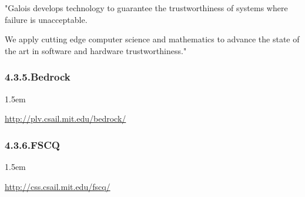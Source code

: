 \documentclass[12pt,twoside]{article}
\begin{document}
\noindent{}"Galois develops technology to guarantee the trustworthiness of
 systems where failure is unacceptable.%

 We apply cutting edge computer science and mathematics to advance the
 state of the art in software and hardware trustworthiness."%

\subsubsection{4.3.5.\hspace*{0.5em}Bedrock}\label{sec-bedrock}%

\begin{mddefinitions}%


\begin{mdbmarginx}{}{}{}{1.5em}%
\begin{mddefdata}%
\href{http://plv.csail.mit.edu/bedrock/}{{\ttfamily http://\hspace{0pt}plv.\hspace{0pt}csail.\hspace{0pt}mit.\hspace{0pt}edu/\hspace{0pt}bedrock/\hspace{0pt}}}%
\end{mddefdata}%
\end{mdbmarginx}%
\end{mddefinitions}%

\subsubsection{4.3.6.\hspace*{0.5em}FSCQ}\label{sec-fscq}%

\begin{mddefinitions}%


\begin{mdbmarginx}{}{}{}{1.5em}%
\begin{mddefdata}%
\href{http://css.csail.mit.edu/fscq/}{{\ttfamily http://\hspace{0pt}css.\hspace{0pt}csail.\hspace{0pt}mit.\hspace{0pt}edu/\hspace{0pt}fscq/\hspace{0pt}}}%
\end{mddefdata}%
\end{mdbmarginx}%
\end{mddefinitions}%
\end{document}
